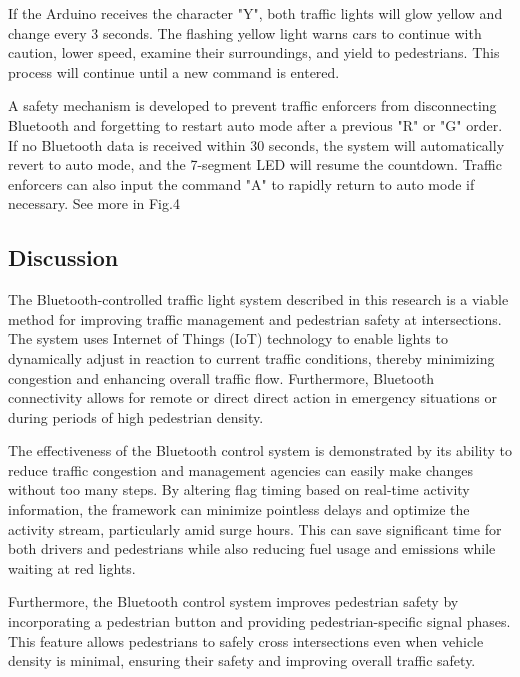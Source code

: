 \documentclass[conference, onecolumn]{IEEEtran}
\begin{document}
If the Arduino receives the character "Y", both traffic lights will glow yellow and change every 3 seconds. The flashing yellow light warns cars to continue with caution, lower speed, examine their surroundings, and yield to pedestrians. This process will continue until a new command is entered.\par

A safety mechanism is developed to prevent traffic enforcers from disconnecting Bluetooth and forgetting to restart auto mode after a previous "R" or "G" order. If no Bluetooth data is received within 30 seconds, the system will automatically revert to auto mode, and the 7-segment LED will resume the countdown. Traffic enforcers can also input the command "A" to rapidly return to auto mode if necessary. See more in Fig.4 \par

\subsection{Discussion}
The Bluetooth-controlled traffic light system described in this research is a viable method for improving traffic management and pedestrian safety at intersections. The system uses Internet of Things (IoT) technology to enable lights to dynamically adjust in reaction to current traffic conditions, thereby minimizing congestion and enhancing overall traffic flow. Furthermore, Bluetooth connectivity allows for remote or direct direct action in emergency situations or during periods of high pedestrian density.\par

The effectiveness of the Bluetooth control system is demonstrated by its ability to reduce traffic congestion and management agencies can easily make changes without too many steps. By altering flag timing based on real-time activity information, the framework can minimize pointless delays and optimize the activity stream, particularly amid surge hours. This can save significant time for both drivers and pedestrians while also reducing fuel usage and emissions while waiting at red lights.\par

Furthermore, the Bluetooth control system improves pedestrian safety by incorporating a pedestrian button and providing pedestrian-specific signal phases. This feature allows pedestrians to safely cross intersections even when vehicle density is minimal, ensuring their safety and improving overall traffic safety.\par
\end{document}
